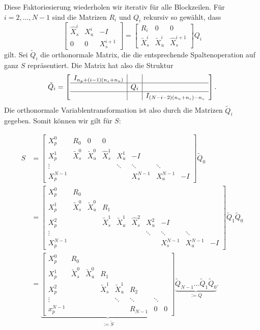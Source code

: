 Diese Faktoriesierung wiederholen wir iterativ für alle Blockzeilen. Für $i=2,\hdots,N-1$ sind die Matrizen $R_i$ und $Q_i$ rekursiv so gewählt, dass
$$\left[ \begin{array}{ccc}
\hat{X}_s^i &  X_u^i & -I \\ 
0 & 0 & X_s^{i+1}
\end{array}\right]
= \left[ 
\begin{array}{ccc} 
R_i & 0 & 0 \\
\tilde{X}^i_s & \tilde{X}^i_u & \hat{X}^{i+1}_s
\end{array}\right]Q_i$$
gilt. Sei $\tilde{Q}_i$ die orthonormale Matrix, die die entsprechende Spaltenoperation auf ganz $S$ repräsentiert. Die Matrix hat also die Struktur $$\tilde{Q}_i=\left[\begin{array}{c|c|c}
I_{n_p+(i-1)(n_s+n_u)} & & \\
\hline
& Q_i & \\
\hline
&&I_{(N-i-2)(n_u+n_s)-n_s}\\
\end{array}\right].$$
Die orthonormale Variablentransformation ist also durch die Matrizen $\tilde{Q}_i$ gegeben. Somit können wir gilt für $S$:

\begin{align*}
S&=\left[\begin{array}{cccccccc}
X_p^0 & R_0 & 0 & 0 &  &  &  &  \\ 
X_p^1 & \tilde{X}_s^0 & \tilde{X}_u^0 & \hat{X}_s^1 & X_u ^1  & -I &  &  \\ 
\vdots &  &  &  & \ddots & \ddots & \ddots &  \\ 
X_p^{N-1} &  &  &  &  & X_s^{N-1} & X_u^{N-1} & -I
\end{array}  \right]\tilde{Q}_0 \\
&=\left[\begin{array}{cccccccccc}
X_p^0 & R_0 &  &  &  &  &  &  \\ 
X_p^1 & \tilde{X}_s^0 & \tilde{X}_u^0 & R_1 &  &  &  &  \\ 
X_p^2  & &  & \tilde{X}_s^1 & \tilde{X}_u^1 & \hat{X}_s^2 & X_u^2& -I  \\ 
\vdots &  &  & & & & \ddots & \ddots & \ddots &  \\ 
X_p^{N-1} &  &  & & & &  & X_s^{N-1} & X_u^{N-1} & -I
\end{array} \right]\tilde{Q}_1\tilde{Q}_0\\
&=\underbrace{\left[
\begin{array}{cccccccc}
X_p^0 & R_0 &  &  &  &  &  &  \\ 
X_p^1 & \tilde{X}_s^0 & \tilde{X}_u^0 & R_1 &  &  &  &  \\ 
X_p^2 &  &  & \tilde{X}_s^1 & \tilde{X}_u^1 & R_2 &  &  \\ 
\vdots &  &  &  & \ddots & \ddots & \ddots &  \\ 
x_p^{N-1} &  &  &  &  & R_{N-1} & 0 & 0
\end{array}  \right]}_{:=\tilde{S}}
\underbrace{\tilde{Q}_{N-1}\hdots \tilde{Q}_1\tilde{Q}_0}_{:=Q}.
\end{align*}



